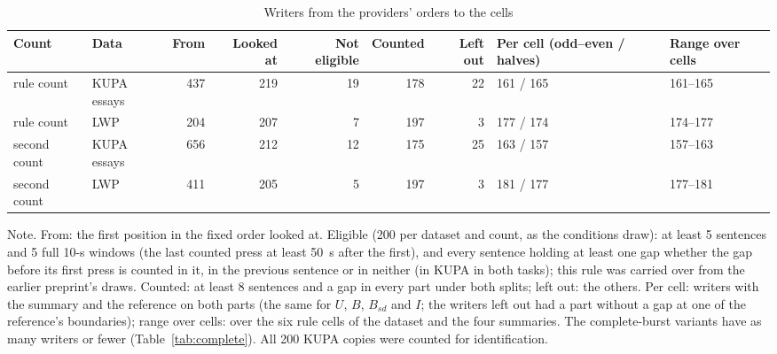 \begin{table}[htbp]
\caption{Writers from the providers' orders to the cells}
\label{tab:flow}
\scriptsize
\begin{tabularx}{\linewidth}{@{}llrrrrrXX@{}}
\toprule
Count & Data & From & Looked at & Not eligible & Counted & Left out & Per cell (odd--even / halves) & Range over cells \\
\midrule
rule count & KUPA essays & 437 & 219 & 19 & 178 & 22 & 161 / 165 & 161--165 \\
rule count & LWP & 204 & 207 & 7 & 197 & 3 & 177 / 174 & 174--177 \\
second count & KUPA essays & 656 & 212 & 12 & 175 & 25 & 163 / 157 & 157--163 \\
second count & LWP & 411 & 205 & 5 & 197 & 3 & 181 / 177 & 177--181 \\
\bottomrule
\end{tabularx}
\par\smallskip\footnotesize Note. From: the first position in the fixed order looked at. Eligible (200 per dataset and count, as the conditions draw): at least 5 sentences and 5 full 10-s windows (the last counted press at least 50~s after the first), and every sentence holding at least one gap whether the gap before its first press is counted in it, in the previous sentence or in neither (in KUPA in both tasks); this rule was carried over from the earlier preprint's draws. Counted: at least 8 sentences and a gap in every part under both splits; left out: the others. Per cell: writers with the summary and the reference on both parts (the same for $U$, $B$, $B_{sd}$ and $I$; the writers left out had a part without a gap at one of the reference's boundaries); range over cells: over the six rule cells of the dataset and the four summaries. The complete-burst variants have as many writers or fewer (Table~\ref{tab:complete}). All 200 KUPA copies were counted for identification.
\end{table}
